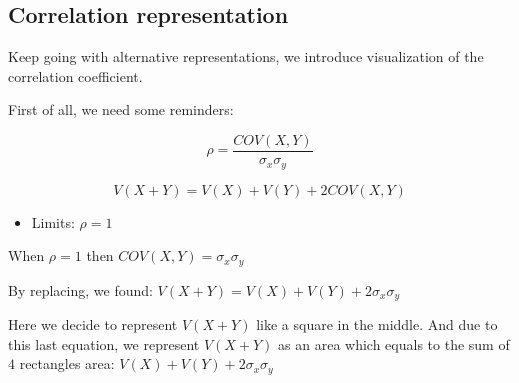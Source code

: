 \documentclass[
]{report}
\providecommand{\tightlist}{%
  \setlength{\itemsep}{0pt}\setlength{\parskip}{0pt}}
\begin{document}
\hypertarget{correlation-representation}{%
\subsection{Correlation representation}\label{correlation-representation}}

Keep going with alternative representations, we introduce visualization of the correlation coefficient.

First of all, we need some reminders:

\[\rho = \frac{COV(X,Y)}{\sigma_x \sigma_y}\]

\[V(X+Y) = V(X) + V(Y) + 2COV(X,Y)\]

\begin{itemize}
\tightlist
\item
  Limits: \(\rho = 1\)
\end{itemize}

When \(\rho = 1\) then \(COV(X,Y) = \sigma_x \sigma_y\)

By replacing, we found: \(V(X+Y) = V(X) + V(Y) + 2\sigma_x \sigma_y\)

\begin{minipage}{0.60\textwidth}
\end{minipage} 
\hspace{3.5ex}
\begin{minipage}{0.35\textwidth}
Here we decide to represent $V(X+Y)$ like a square in the middle. And due to this last equation, we represent $V(X+Y)$ as an area which equals to the sum of $4$ rectangles area: $V(X) + V(Y) + 2\sigma_x \sigma_y$
\end{minipage}
\end{document}
